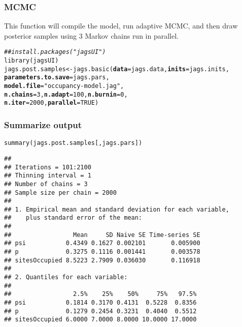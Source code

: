 \documentclass[color=usenames,dvipsnames,handout]{beamer}\usepackage[]{graphicx}\usepackage[]{xcolor}
\makeatletter
\newcommand{\hlnum}[1]{\textcolor[rgb]{0.69,0.494,0}{#1}}%
\newcommand{\hlsng}[1]{\textcolor[rgb]{0.749,0.012,0.012}{#1}}%
\newcommand{\hlcom}[1]{\textcolor[rgb]{0.514,0.506,0.514}{\textit{#1}}}%
\newcommand{\hldef}[1]{\textcolor[rgb]{0,0,0}{#1}}%
\newcommand{\hlkwb}[1]{\textcolor[rgb]{0,0.341,0.682}{#1}}%
\newcommand{\hlkwc}[1]{\textcolor[rgb]{0,0,0}{\textbf{#1}}}%
\newcommand{\hlkwd}[1]{\textcolor[rgb]{0.004,0.004,0.506}{#1}}%
\newenvironment{kframe}{%
 \def\at@end@of@kframe{}%
 \ifinner\ifhmode%
  \def\at@end@of@kframe{\end{minipage}}%
  \begin{minipage}{\columnwidth}%
 \fi\fi%
 \def\FrameCommand##1{\hskip\@totalleftmargin \hskip-\fboxsep
 \colorbox{shadecolor}{##1}\hskip-\fboxsep
     \hskip-\linewidth \hskip-\@totalleftmargin \hskip\columnwidth}%
 \MakeFramed {\advance\hsize-\width
   \@totalleftmargin\z@ \linewidth\hsize
   \@setminipage}}%
 {\par\unskip\endMakeFramed%
 \at@end@of@kframe}
\newenvironment{knitrout}{}{} %
\makeatother
\begin{document}
\begin{frame}[fragile]
  \frametitle{MCMC}
  \small
  This function will compile the model, run adaptive MCMC, and then
  draw posterior samples using 3 Markov chains run in parallel. \\
\begin{knitrout}\scriptsize
{}\color{fgcolor}\begin{kframe}
\begin{alltt}
\hlcom{## install.packages("jagsUI")}
\hlkwd{library}\hldef{(jagsUI)}
\hldef{jags.post.samples} \hlkwb{<-} \hlkwd{jags.basic}\hldef{(}\hlkwc{data}\hldef{=jags.data,} \hlkwc{inits}\hldef{=jags.inits,}
                                \hlkwc{parameters.to.save}\hldef{=jags.pars,}
                                \hlkwc{model.file}\hldef{=}\hlsng{"occupancy-model.jag"}\hldef{,}
                                \hlkwc{n.chains}\hldef{=}\hlnum{3}\hldef{,} \hlkwc{n.adapt}\hldef{=}\hlnum{100}\hldef{,} \hlkwc{n.burnin}\hldef{=}\hlnum{0}\hldef{,}
                                \hlkwc{n.iter}\hldef{=}\hlnum{2000}\hldef{,} \hlkwc{parallel}\hldef{=}\hlnum{TRUE}\hldef{)}
\end{alltt}
\end{kframe}
\end{knitrout}
\end{frame}



\begin{frame}[fragile]
  \frametitle{Summarize output}
\begin{knitrout}\scriptsize
{}\color{fgcolor}\begin{kframe}
\begin{alltt}
\hlkwd{summary}\hldef{(jags.post.samples[,jags.pars])}
\end{alltt}
\begin{verbatim}
## 
## Iterations = 101:2100
## Thinning interval = 1 
## Number of chains = 3 
## Sample size per chain = 2000 
## 
## 1. Empirical mean and standard deviation for each variable,
##    plus standard error of the mean:
## 
##                 Mean     SD Naive SE Time-series SE
## psi           0.4349 0.1627 0.002101       0.005900
## p             0.3275 0.1116 0.001441       0.003578
## sitesOccupied 8.5223 2.7909 0.036030       0.116918
## 
## 2. Quantiles for each variable:
## 
##                 2.5%    25%    50%     75%   97.5%
## psi           0.1814 0.3170 0.4131  0.5228  0.8356
## p             0.1279 0.2454 0.3231  0.4040  0.5512
## sitesOccupied 6.0000 7.0000 8.0000 10.0000 17.0000
\end{verbatim}
\end{kframe}
\end{knitrout}
\end{frame}
\end{document}
